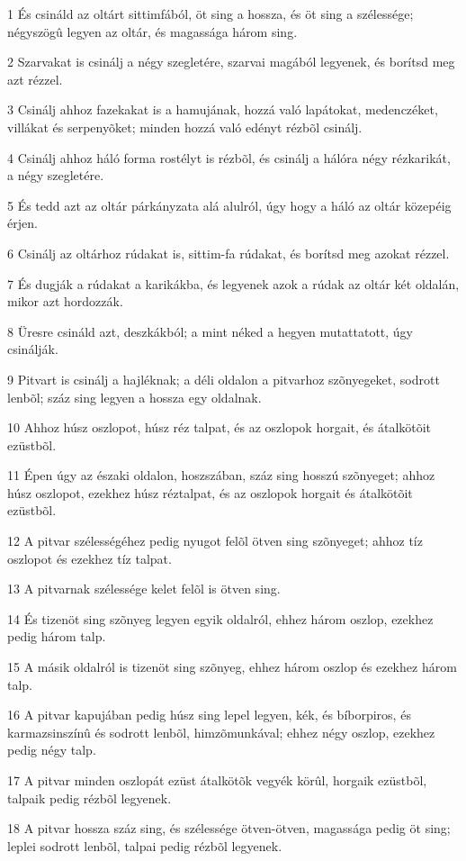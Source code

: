 \par 1 És csináld az oltárt sittimfából, öt sing a hossza, és öt sing a szélessége; négyszögû legyen az oltár, és magassága három sing.
\par 2 Szarvakat is csinálj a négy szegletére, szarvai magából legyenek, és borítsd meg azt rézzel.
\par 3 Csinálj ahhoz fazekakat is a hamujának, hozzá való lapátokat, medenczéket, villákat és serpenyõket; minden hozzá való edényt rézbõl csinálj.
\par 4 Csinálj ahhoz háló forma rostélyt is rézbõl, és csinálj a hálóra négy rézkarikát, a négy szegletére.
\par 5 És tedd azt az oltár párkányzata alá alulról, úgy hogy a háló az oltár közepéig érjen.
\par 6 Csinálj az oltárhoz rúdakat is, sittim-fa rúdakat, és borítsd meg azokat rézzel.
\par 7 És dugják a rúdakat a karikákba, és legyenek azok a rúdak az oltár két oldalán, mikor azt hordozzák.
\par 8 Üresre csináld azt, deszkákból; a mint néked a hegyen mutattatott, úgy csinálják.
\par 9 Pitvart is csinálj a hajléknak; a déli oldalon a pitvarhoz szõnyegeket, sodrott lenbõl; száz sing legyen a hossza egy oldalnak.
\par 10 Ahhoz húsz oszlopot, húsz réz talpat, és az oszlopok horgait, és átalkötõit ezüstbõl.
\par 11 Épen úgy az északi oldalon, hoszszában, száz sing hosszú szõnyeget; ahhoz húsz oszlopot, ezekhez húsz réztalpat, és az oszlopok horgait és átalkötõit ezüstbõl.
\par 12 A pitvar szélességéhez pedig nyugot felõl ötven sing szõnyeget; ahhoz tíz oszlopot és ezekhez tíz talpat.
\par 13 A pitvarnak szélessége kelet felõl is ötven sing.
\par 14 És tizenöt sing szõnyeg legyen egyik oldalról, ehhez három oszlop, ezekhez pedig három talp.
\par 15 A másik oldalról is tizenöt sing szõnyeg, ehhez három oszlop és ezekhez három talp.
\par 16 A pitvar kapujában pedig húsz sing lepel legyen, kék, és bíborpiros, és karmazsinszínû és sodrott lenbõl, himzõmunkával; ehhez négy oszlop, ezekhez pedig négy talp.
\par 17 A pitvar minden oszlopát ezüst átalkötõk vegyék körûl, horgaik ezüstbõl, talpaik pedig rézbõl legyenek.
\par 18 A pitvar hossza száz sing, és szélessége ötven-ötven, magassága pedig öt sing; leplei sodrott lenbõl, talpai pedig rézbõl legyenek.
